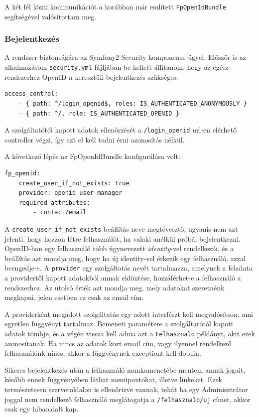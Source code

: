 \documentclass[a4paper,12pt,oneside]{report}
\begin{document}
A két fél közti kommunikációt a korábban már említett {\tt FpOpenIdBundle} segítségével valósítottam meg.

\subsubsection*{Bejelentkezés}

A rendszer biztonságára az Symfony2 Security komponense ügyel. Először is az alkalmazásom {\tt security.yml} fájljában be kellett állítanom, hogy az egész rendszerhez OpenID-n keresztüli bejelentkezés szükséges:

\begin{lstlisting}
access_control:
    - { path: ^/login_openid$, roles: IS_AUTHENTICATED_ANONYMOUSLY }
    - { path: ^/, role: IS_AUTHENTICATED_OPENID }
\end{lstlisting}

A szolgáltatótól kapott adatok ellenőrzését a {\tt /login\_openid} url-en elérhető controller végzi, így azt el kell tudni érni azonosítás nélkül.

A következő lépés az FpOpenIdBundle konfigurálása volt:

\begin{lstlisting}
fp_openid:
    create_user_if_not_exists: true
    provider: openid_user_manager
    required_attributes:
        - contact/email
\end{lstlisting}

A {\tt create\_user\_if\_not\_exists} beállítás neve megtévesztő, ugyanis nem azt jelenti, hogy hozzon létre felhasználót, ha valaki anélkül próbál bejelentkezni. OpenID-ban egy felhasználó több úgynevezett {\em identity}-vel rendelkezik, és a beállítás azt mondja meg, hogy ha új identity-vel érkezik egy felhasználó, azzal beengedje-e. A {\tt provider} egy szolgáltatás nevét tartalmazza, amelynek a feladata a providertől kapott adatokból annak eldöntése, hozzáférhet-e a felhasználó a rendszerhez. Az utolsó érték azt mondja meg, mely adatokat szeretnénk megkapni, jelen esetben ez csak az email cím.

A providerként megadott szolgáltatás egy adott interfészt kell megvalósítson, ami egyetlen függvényt tartalmaz. Bemeneti paramétere a szolgáltatótól kapott adatok tömbje, és a végén vissza kell adnia azt a {\tt Felhasznalo} példányt, akit ezek azonosítanak. Ha nincs az adatok közt email cím, vagy ilyennel rendelkező felhasználónk nincs, akkor a függvénynek exceptiont kell dobnia.

Sikeres bejelentkezés után a felhasználó munkamenetébe mentem annak jogait, később ennek függvényében láthat menüpontokat, illetve linkeket. Ezek természetesen szerveroldalon is ellenőrizve vannak, tehát ha egy Adminisztrátor joggal nem rendelkező felhasználó meglátogatja a {\tt /felhasznalo/uj} címet, akkor csak egy hibaoldalt kap.
\end{document}
